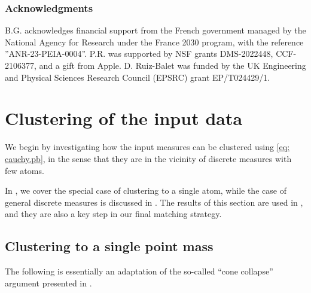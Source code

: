 \documentclass[a4paper,11pt]{article}
\theoremstyle{plain}
\numberwithin{equation}{section}
\begin{document}
\subsubsection*{Acknowledgments} 

B.G. acknowledges financial support from the French government managed by the National Agency for Research under the France 2030 program, with the reference ”ANR-23-PEIA-0004”.
P.R. was supported by NSF grants DMS-2022448, CCF-2106377, and a gift from Apple.
D. Ruiz-Balet was funded by the UK Engineering and Physical Sciences Research Council (EPSRC) grant
EP/T024429/1.


\section{Clustering of the input data} \label{sec: clustering}

We begin by investigating how the input measures can be clustered using \eqref{eq: cauchy.pb}, in the sense that they are in the vicinity of discrete measures with few atoms.

In {\bf {}}, we cover the special case of clustering to a single atom, while the case of general discrete measures is discussed in {\bf {}}. The results of this section are used in {\bf {}}, and they are also a key step in our final matching strategy.

\subsection{Clustering to a single point mass} \label{sec: diracs}

The following is essentially an adaptation of the so-called ``cone collapse'' argument presented in \cite[Lemma 6.4]{geshkovski2023mathematical}.
\end{document}
